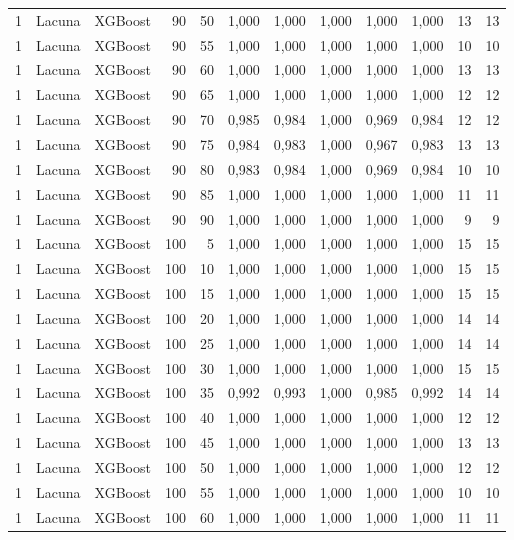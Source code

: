 \begin{longtable}{@{}rllrrrrrrrrr@{}}
1 & Lacuna & XGBoost & 90 & 50 & 1,000 & 1,000 & 1,000 & 1,000 & 1,000 & 13 & 13 \\
1 & Lacuna & XGBoost & 90 & 55 & 1,000 & 1,000 & 1,000 & 1,000 & 1,000 & 10 & 10 \\
1 & Lacuna & XGBoost & 90 & 60 & 1,000 & 1,000 & 1,000 & 1,000 & 1,000 & 13 & 13 \\
1 & Lacuna & XGBoost & 90 & 65 & 1,000 & 1,000 & 1,000 & 1,000 & 1,000 & 12 & 12 \\
1 & Lacuna & XGBoost & 90 & 70 & 0,985 & 0,984 & 1,000 & 0,969 & 0,984 & 12 & 12 \\
1 & Lacuna & XGBoost & 90 & 75 & 0,984 & 0,983 & 1,000 & 0,967 & 0,983 & 13 & 13 \\
1 & Lacuna & XGBoost & 90 & 80 & 0,983 & 0,984 & 1,000 & 0,969 & 0,984 & 10 & 10 \\
1 & Lacuna & XGBoost & 90 & 85 & 1,000 & 1,000 & 1,000 & 1,000 & 1,000 & 11 & 11 \\
1 & Lacuna & XGBoost & 90 & 90 & 1,000 & 1,000 & 1,000 & 1,000 & 1,000 & 9 & 9 \\
1 & Lacuna & XGBoost & 100 & 5 & 1,000 & 1,000 & 1,000 & 1,000 & 1,000 & 15 & 15 \\
1 & Lacuna & XGBoost & 100 & 10 & 1,000 & 1,000 & 1,000 & 1,000 & 1,000 & 15 & 15 \\
1 & Lacuna & XGBoost & 100 & 15 & 1,000 & 1,000 & 1,000 & 1,000 & 1,000 & 15 & 15 \\
1 & Lacuna & XGBoost & 100 & 20 & 1,000 & 1,000 & 1,000 & 1,000 & 1,000 & 14 & 14 \\
1 & Lacuna & XGBoost & 100 & 25 & 1,000 & 1,000 & 1,000 & 1,000 & 1,000 & 14 & 14 \\
1 & Lacuna & XGBoost & 100 & 30 & 1,000 & 1,000 & 1,000 & 1,000 & 1,000 & 15 & 15 \\
1 & Lacuna & XGBoost & 100 & 35 & 0,992 & 0,993 & 1,000 & 0,985 & 0,992 & 14 & 14 \\
1 & Lacuna & XGBoost & 100 & 40 & 1,000 & 1,000 & 1,000 & 1,000 & 1,000 & 12 & 12 \\
1 & Lacuna & XGBoost & 100 & 45 & 1,000 & 1,000 & 1,000 & 1,000 & 1,000 & 13 & 13 \\
1 & Lacuna & XGBoost & 100 & 50 & 1,000 & 1,000 & 1,000 & 1,000 & 1,000 & 12 & 12 \\
1 & Lacuna & XGBoost & 100 & 55 & 1,000 & 1,000 & 1,000 & 1,000 & 1,000 & 10 & 10 \\
1 & Lacuna & XGBoost & 100 & 60 & 1,000 & 1,000 & 1,000 & 1,000 & 1,000 & 11 & 11 \\

\end{longtable}
